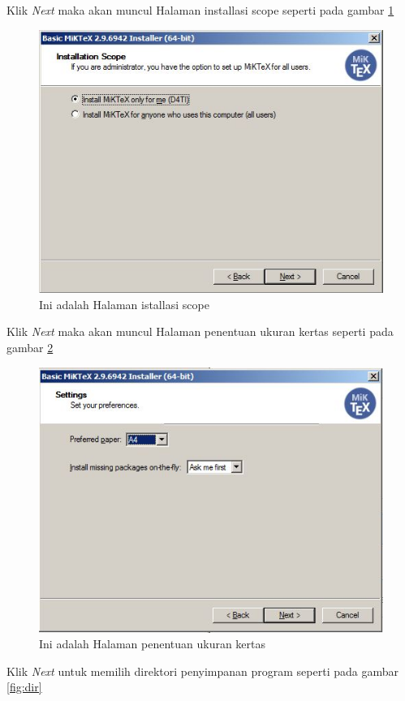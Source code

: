 \begin{enumerate}
{\begin{figure}[!htbp]
		 \end{figure}
	\item Klik \textit{Next} maka akan muncul Halaman installasi scope seperti pada gambar \ref{fig:IS}
		 \begin{figure}[!htbp]
  		 \centering
 		 \includegraphics[width=.75\textwidth]{figures/Miktex/IS.JPG}
  		 \caption{Ini adalah Halaman istallasi scope}\label{fig:IS}
		 \end{figure}
	\item Klik \textit{Next} maka akan muncul Halaman penentuan ukuran kertas seperti pada gambar \ref{fig:paper}
		 \begin{figure}[!htbp]
  		 \centering
 		 \includegraphics[width=.75\textwidth]{figures/Miktex/paper.JPG}
  		 \caption{Ini adalah Halaman penentuan ukuran kertas}\label{fig:paper}
		 \end{figure}
	\item Klik \textit{Next} untuk memilih direktori penyimpanan program seperti pada gambar \ref{fig:dir}
		 \begin{figure}[!htbp]
  		 \centering

\end{figure}}
\end{enumerate}
